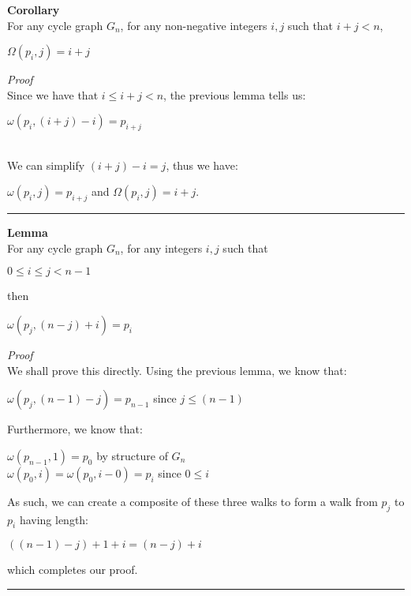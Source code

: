 \documentclass[a4paper,12pt]{article}
\begin{document}
\begin{tcolorbox}
\textbf{Corollary}\\
For any cycle graph $G_n$, for any non-negative integers $i, j$ such that $i + j < n$,
\begin{center}
$\Omega(p_i, j) = i + j$
\end{center}
\end{tcolorbox}
\noindent
\textit{Proof}\\
Since we have that $i \leq i + j < n$, the previous lemma tells us:
\begin{center}
$\omega(p_i, (i + j) - i) = p_{i+j}$
\end{center}
\noindent
\\
We can simplify $(i + j) - i = j$, thus we have:
\begin{center}
$\omega(p_i, j) = p_{i+j}$ and 
$\Omega(p_i, j) = i + j$.
\end{center}
\begin{center}
\noindent\rule{8cm}{0.4pt}
\end{center}

\begin{tcolorbox}
\textbf{Lemma}\\
For any cycle graph $G_n$, for any integers $i, j$ such that
\begin{center}
$0 \leq i \leq j < n - 1$
\end{center}
then
\begin{center}
$\omega(p_j, (n - j) + i) = p_i$
\end{center}
\end{tcolorbox}
\noindent
\textit{Proof}\\
We shall prove this directly. Using the previous lemma, we know that:
\begin{center}
$\omega(p_j, (n - 1) - j) = p_{n-1}$ since $j \leq (n - 1)$
\end{center}
Furthermore, we know that:
\begin{center}
$\omega(p_{n-1}, 1) = p_0$ by structure of $G_n$\\
$\omega(p_0, i) = \omega(p_0, i - 0) = p_i$ since $0 \leq i$
\end{center}
As such, we can create a composite of these three walks to form a walk from $p_j$ to $p_i$ having length:
\begin{center}
$((n - 1) - j) + 1 + i = (n - j) + i$
\end{center}
which completes our proof.
\begin{center}
\noindent\rule{8cm}{0.4pt}
\end{center}
\end{document}

